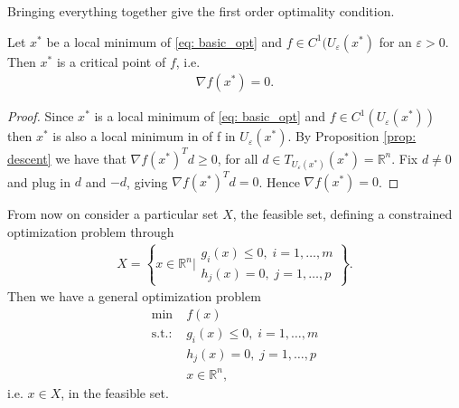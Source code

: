 Bringing everything together give the first order optimality condition.
\begin{theorem}
    Let $x^{*}$ be a local minimum of \ref{eq: basic_opt} and $f \in C^{1}
    (U_\varepsilon(x^{*} )$ for an $\varepsilon >0$. Then $x^{*}$ is a
    critical point of $f$, i.e.
    \begin{align}
        \nabla f(x^{*}) = 0.
    \end{align}
\end{theorem}
\begin{proof}
    Since $x^{*}$ is a local minimum of \ref{eq: basic_opt} and $f \in C^{1}
    (U_\varepsilon(x^{*} ))$ then $x^{*} $ is also a local minimum in of f in
    $U_\varepsilon(x^{*})$. By Proposition \ref{prop: descent} we have that
    $\nabla f(x^{*} )^{T}  d \ge 0$, for all $d \in T_{U_\varepsilon(x^{*})
    }(x^{*} ) = \mathbb{R} ^{n}$. Fix $d \neq 0$ and plug in $d$ and $-d$,
    giving $\nabla f(x^{*})^{T} d = 0$. Hence $\nabla f(x^{*} ) = 0$.
\end{proof}
From now on consider a particular set $X$, the feasible set, defining a
constrained optimization problem through
\begin{align}
    X = \left\{ x \in \mathbb{R}^{n}\Big|
        \begin{array}{l}
            g_i(x) \le 0,\; i=1,\ldots,m\\
            h_j(x) = 0,\; j=1,\ldots,p
    \end{array} \right\}.
\end{align}
Then we have a general optimization problem
\begin{align}
    \min\;&f(x) \label{eq: gen_constraned}\\
    \text{s.t.:}\;&g_i(x) \le 0,\; i=1,\ldots,m \nonumber\\
        &h_j(x) = 0,\; j=1,\ldots,p \nonumber\\
        &x \in \mathbb{R}^{n}\nonumber,
\end{align}
i.e. $x \in X$, in the feasible set.

